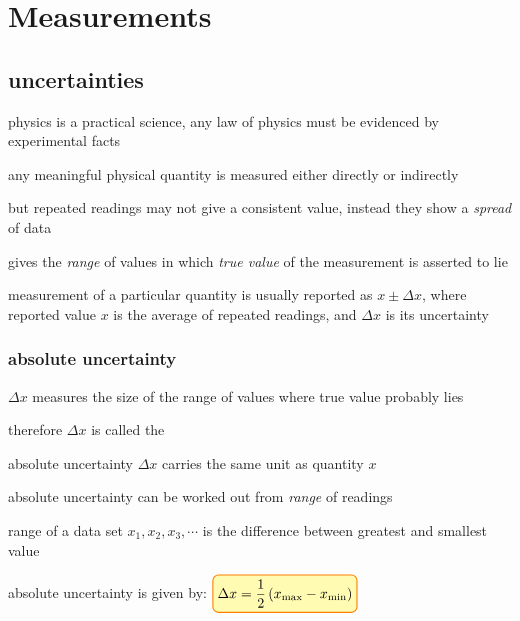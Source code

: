 \section{Measurements}

\subsection{uncertainties}

physics is a practical science, any law of physics must be evidenced by experimental facts

any meaningful physical quantity is measured either directly or indirectly

but repeated readings may not give a consistent value, instead they show a \emph{spread} of data

 gives the \emph{range} of values in which \emph{true value} of the measurement is asserted to lie

measurement of a particular quantity is usually reported as $x \pm \Delta x$, where reported value $x$ is the average of repeated readings, and $\Delta x$ is its uncertainty

\subsubsection{absolute uncertainty}

$\Delta x$ measures the size of the range of values where true value probably lies

therefore $\Delta x$ is called the 

\cmt absolute uncertainty $\Delta x$ carries the same unit as quantity $x$

\cmt absolute uncertainty can be worked out from \emph{range} of readings

range of a data set ${x_1, x_2, x_3, \cdots}$ is the difference between greatest and smallest value

absolute uncertainty is given by: $\boxed{\Delta x = \frac{1}{2}\left(x_\tmax-x_\tmin\right)}$

